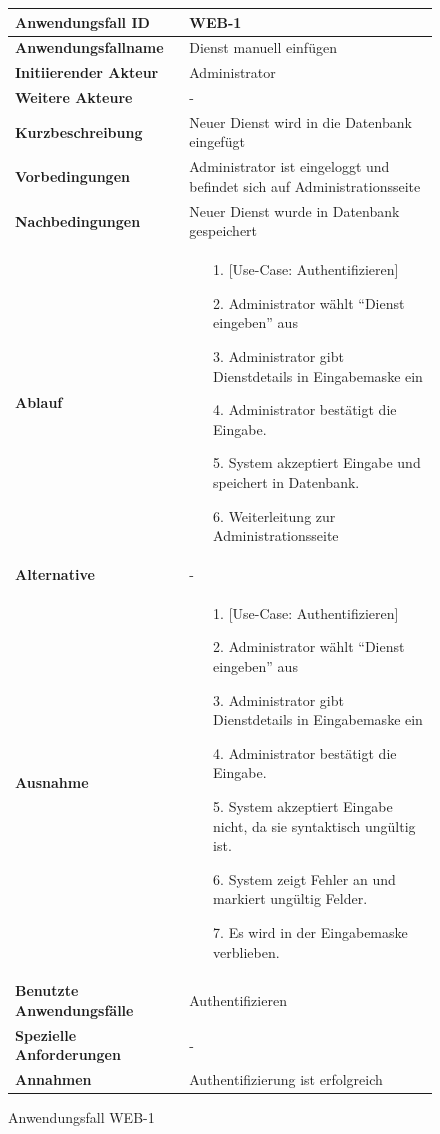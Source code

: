 \begin{figure}[h]
	\centering
	\begin{tabularx}{\textwidth}{ X | X }
		\textbf{Anwendungsfall ID} & WEB-1 \\ \hline
		\textbf{Anwendungsfallname} & Dienst manuell einfügen \\ \hline
		\textbf{Initiierender Akteur} & Administrator \\ \hline
		\textbf{Weitere Akteure} & - \\ \hline
		\textbf{Kurzbeschreibung} & Neuer Dienst wird in die Datenbank eingefügt \\ \hline
		\textbf{Vorbedingungen} & Administrator ist eingeloggt und befindet sich auf Administrationsseite \\ \hline
		\textbf{Nachbedingungen} & Neuer Dienst wurde in Datenbank gespeichert \\ \hline
		\textbf{Ablauf} &
		\begin{enumerate}
			\item [1.] [Use-Case: Authentifizieren]
			\item [2.] Administrator wählt ``Dienst eingeben'' aus
			\item [3.] Administrator gibt Dienstdetails in Eingabemaske ein
			\item [4.] Administrator bestätigt die Eingabe.
			\item [5.] System akzeptiert Eingabe und speichert in Datenbank.
			\item [6.] Weiterleitung zur Administrationsseite
		\end{enumerate} \\ \hline
		\textbf{Alternative} & - \\ \hline
		\textbf{Ausnahme} &
		\begin{enumerate}
			\item [1.] [Use-Case: Authentifizieren]
			\item [2.] Administrator wählt ``Dienst eingeben'' aus
			\item [3.] Administrator gibt Dienstdetails in Eingabemaske ein
			\item [4.] Administrator bestätigt die Eingabe.
			\item [5.] System akzeptiert Eingabe nicht, da sie syntaktisch ungültig ist.
			\item [6.] System zeigt Fehler an und markiert ungültig Felder.
			\item [7.] Es wird in der Eingabemaske verblieben.
		\end{enumerate} \\ \hline
		\textbf{Benutzte Anwendungsfälle} & Authentifizieren \\ \hline
		\textbf{Spezielle Anforderungen} & - \\ \hline
		\textbf{Annahmen} & Authentifizierung ist erfolgreich
	\end{tabularx}
	\caption{Anwendungsfall WEB-1}
	\label{fig:anwendungsfall-server-tabelle-web-1}
\end{figure}

